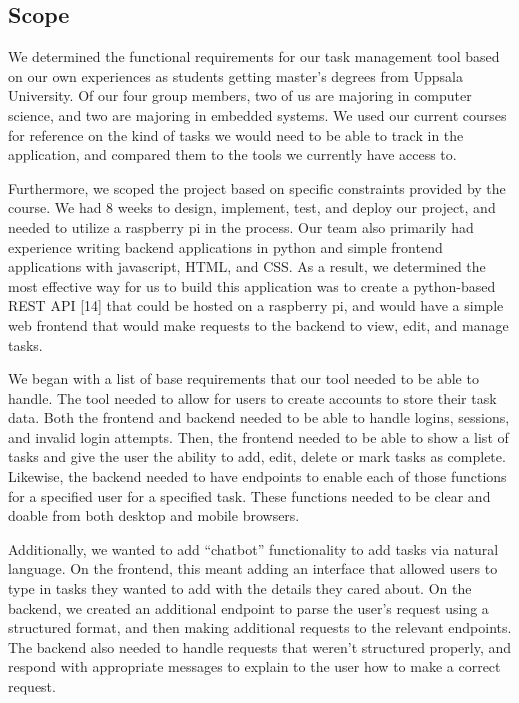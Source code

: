 \documentclass[11pt,oneside]{article}
\begin{document}
\subsection{Scope}
We determined the functional requirements for our task management tool based on our own experiences as students getting master’s degrees from Uppsala University. Of our four group members, two of us are majoring in computer science, and two are majoring in embedded systems. We used our current courses for reference on the kind of tasks we would need to be able to track in the application, and compared them to the tools we currently have access to. 

Furthermore, we scoped the project based on specific constraints provided by the course. We had 8 weeks to design, implement, test, and deploy our project, and needed to utilize a raspberry pi in the process. Our team also primarily had experience writing backend applications in python and simple frontend applications with javascript, HTML, and CSS. As a result, we determined the most effective way for us to build this application was to create a python-based REST API [14] that could be hosted on a raspberry pi, and would have a simple web frontend that would make requests to the backend to view, edit, and manage tasks.

We began with a list of base requirements that our tool needed to be able to handle. The tool needed to allow for users to create accounts to store their task data. Both the frontend and backend needed to be able to handle logins, sessions, and invalid login attempts. Then, the frontend needed to be able to show a list of tasks and give the user the ability to add, edit, delete or mark tasks as complete. Likewise, the backend needed to have endpoints to enable each of those functions for a specified user for a specified task. These functions needed to be clear and doable from both desktop and mobile browsers.

Additionally, we wanted to add “chatbot” functionality to add tasks via natural language. On the frontend, this meant adding an interface that allowed users to type in tasks they wanted to add with the details they cared about. On the backend, we created an additional endpoint to parse the user’s request using a structured format, and then making additional requests to the relevant endpoints. The backend also needed to handle requests that weren’t structured properly, and respond with appropriate messages to explain to the user how to make a correct request. 
\end{document}
